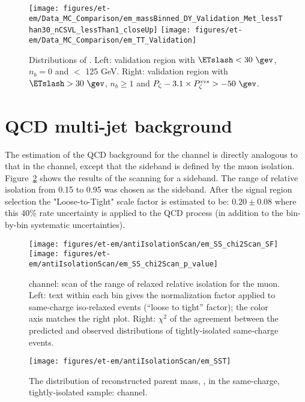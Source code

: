 \begin{figure}\centering
  \texttt{[image: figures/et-em/Data\_MC\_Comparison/em\_massBinned\_DY\_Validation\_Met\_lessThan30\_nCSVL\_lessThan1\_closeUp]}
  \texttt{[image: figures/et-em/Data\_MC\_Comparison/em\_TT\_Validation]}
  \caption{\label{fig:em_dy_tt} Distributions of \meffemu. Left:
    validation region with $\ETslash<30~\gev$, $n_b = 0$ and \meffemu $<$ 125 GeV.  Right:
    validation region with $\ETslash>30~\gev$, $n_b\geq1$ and $P_{\zeta}- 3.1 \times P_{\zeta}^{vis} > -50~\gev$.}
\end{figure}




\section{QCD multi-jet background}\label{sec:em_qcd}
The estimation of the QCD background for the \tetm channel is directly
analogous to that in the \teth channel, except that the sideband is
defined by the muon isolation.  Figure~\ref{fig:em_scans} shows the
results of the scanning for a sideband.  The range of relative
isolation from 0.15 to 0.95 was chosen as the sideband. After the
signal region selection the "Loose-to-Tight" scale factor is estimated
to be: $0.20 \pm 0.08$ where this 40\% rate uncertainty is applied to
the QCD process (in addition to the bin-by-bin systematic
uncertainties).

\begin{figure}\centering
  \texttt{[image: figures/et-em/antiIsolationScan/em\_SS\_chi2Scan\_SF]}
  \texttt{[image: figures/et-em/antiIsolationScan/em\_SS\_chi2Scan\_p\_value]}
  \caption{\label{fig:em_scans} \tetm channel: scan of the range of
    relaxed relative isolation for the muon.  Left: text within each
    bin gives the normalization factor applied to same-charge
    iso-relaxed events (``loose to tight'' factor); the color axis
    matches the right plot.  Right: $\chi^2$ of the agreement between
    the predicted and observed distributions of tightly-isolated
    same-charge events.}
\end{figure}

\begin{figure}\centering
  \texttt{[image: figures/et-em/antiIsolationScan/em\_SST]}
  \caption{\label{fig:em_sst} The distribution of reconstructed parent
    mass, \meffemu, in the same-charge, tightly-isolated sample: \tetm
    channel.}
\end{figure}

